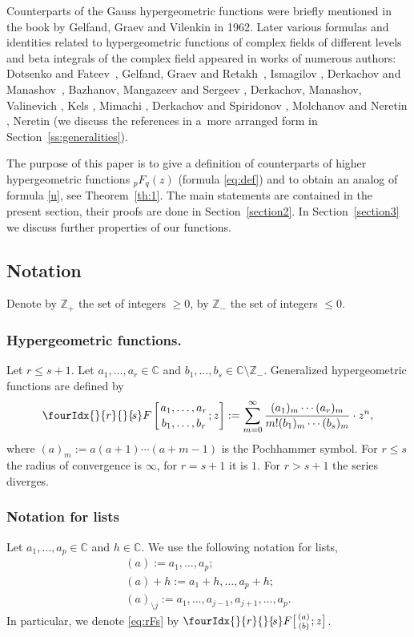 \documentclass[pdftex]{sigma}
\numberwithin{equation}{section}
\newcommand{\hyp}[2]{\fourIdx{}{#1}{}{\!#2}F}
\def\C {{\mathbb C }}
\def\Z{{\mathbb Z}}
\def\le{\leqslant}
\def\ge{\geqslant}
\begin{document}
Counterparts of the Gauss hypergeometric functions were briefly mentioned
in the book by Gelfand, Graev and Vilenkin \cite[Section~II.3.7]{GGV} in 1962.
Later various formulas and identities related to hypergeometric functions
of complex fields of different levels and beta integrals of the complex field
appeared in works of numerous authors: Dotsenko and Fateev~\cite{DF},
Gelfand, Graev and Retakh~\cite{GGR},
Ismagilov \cite{Ism1,Ism2},
Derkachov and Manashov~\cite{DM1,DM2},
Bazhanov, Mangazeev and Sergeev \cite{BMS},
Derkachov, Manashov, Valinevich \cite{DMV1,DMV2},
Kels \cite{Kel1,Kel2},
Mimachi \cite{Mim},
Derkachov and Spiridonov \cite{DS},
Molchanov and Neretin \cite{MN},
Neretin \cite{Ner-doug}
(we discuss the references in a~more arranged form in
Section~\ref{ss:generalities}).

The purpose of this paper is to give a definition of counterparts
of higher hypergeometric functions $_pF_q(z)$ (formula \eqref{eq:def})
and to obtain an analog of formula \eqref{u},
see Theorem~\ref{th:1}.
The main statements are contained in the present section,
their proofs are done in Section~\ref{section2}.
In Section~\ref{section3} we discuss further properties of our functions.

\subsection{Notation}
Denote by $\Z_+$ the set of integers $\ge 0$, by $\Z_-$ the set of integers $\le 0$.

\subsubsection{Hypergeometric functions.}
Let $r\le s+1$.
Let $a_1,\dots,a_r\in\C$ and $b_1,\dots,b_s\in\C\setminus\Z_-$.
Generalized hypergeometric functions are defined by
\begin{equation}
\hyp{r}{s}\left[\genfrac{}{}{0pt}{}{a_1,\dots,a_r}{b_1,\dots,b_r};z\right]
:=\sum_{m=0}^\infty
\frac{(a_1)_m\cdots (a_r)_m}{m! (b_1)_m\cdots (b_s)_m}\cdot z^n,
\label{eq:rFs}
\end{equation}
where $(a)_m:=a(a+1)\cdots(a+m-1)$ is the Pochhammer symbol.
For $r\le s$ the radius of convergence is $\infty$, for $r=s+1$ it is $1$.
For $r>s+1$ the series diverges.

\subsubsection{Notation for lists}
Let $a_1, \dots, a_p\in \C$ and $h\in\C$.
We use the following notation for lists,
\begin{gather*}
(a):= a_1, \dots, a_p;\\
(a)+h:= a_1+h, \dots, a_p+h;\\
(a)_{\setminus j}:= a_1,\dots,a_{j-1},a_{j+1},\dots,a_p.
\end{gather*}
In particular, we denote \eqref{eq:rFs}
by $\hyp{r}{s}\big[\genfrac{}{}{0pt}{}{(a)}{(b)};z\big]$.
\end{document}
